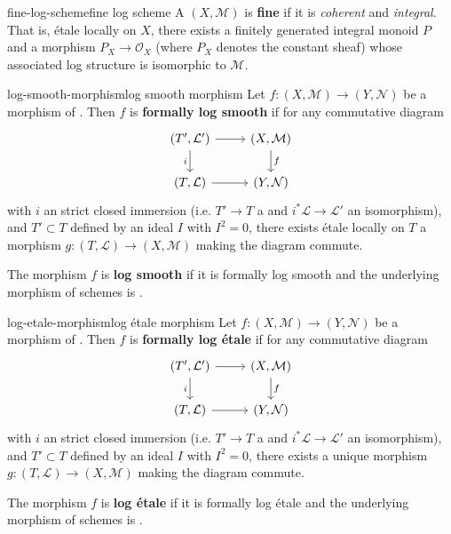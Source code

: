 \begin{topic}{fine-log-scheme}{fine log scheme}
    A  $(X, \mathcal{M})$ is \textbf{fine} if it is \textit{coherent} and \textit{integral}. That is, étale locally on $X$, there exists a finitely generated integral monoid $P$ and a morphism $P_X \to \mathcal{O}_X$ (where $P_X$ denotes the constant sheaf) whose associated log structure is isomorphic to $\mathcal{M}$.
\end{topic}

\begin{topic}{log-smooth-morphism}{log smooth morphism}
    Let $f : (X, \mathcal{M}) \to (Y, \mathcal{N})$ be a morphism of  . Then $f$ is \textbf{formally log smooth} if for any commutative diagram
    \[ \begin{tikzcd} (T', \mathcal{L}') \arrow{r} \arrow[swap]{d}{i} & (X, \mathcal{M}) \arrow{d}{f} \\ (T, \mathcal{L}) \arrow{r} & (Y, \mathcal{N}) \end{tikzcd} \]
    with $i$ an strict closed immersion (i.e. $T' \to T$ a  and $i^* \mathcal{L} \to \mathcal{L}'$ an isomorphism), and $T' \subset T$ defined by an ideal $I$ with $I^2 = 0$, there exists étale locally on $T$ a morphism $g : (T, \mathcal{L}) \to (X, \mathcal{M})$ making the diagram commute.
    
    The morphism $f$ is \textbf{log smooth} if it is formally log smooth and the underlying morphism of schemes is .
\end{topic}

\begin{topic}{log-etale-morphism}{log étale morphism}
    Let $f : (X, \mathcal{M}) \to (Y, \mathcal{N})$ be a morphism of  . Then $f$ is \textbf{formally log étale} if for any commutative diagram
    \[ \begin{tikzcd} (T', \mathcal{L}') \arrow{r} \arrow[swap]{d}{i} & (X, \mathcal{M}) \arrow{d}{f} \\ (T, \mathcal{L}) \arrow{r} & (Y, \mathcal{N}) \end{tikzcd} \]
    with $i$ an strict closed immersion (i.e. $T' \to T$ a  and $i^* \mathcal{L} \to \mathcal{L}'$ an isomorphism), and $T' \subset T$ defined by an ideal $I$ with $I^2 = 0$, there exists a unique morphism $g : (T, \mathcal{L}) \to (X, \mathcal{M})$ making the diagram commute.
    
    The morphism $f$ is \textbf{log étale} if it is formally log étale and the underlying morphism of schemes is .
\end{topic}

